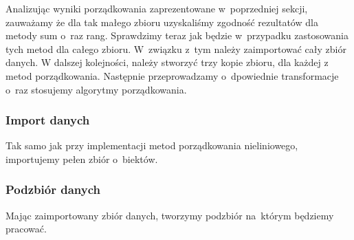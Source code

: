 \documentclass[12pt,a4paper]{report}
\begin{document}
{Analizując wyniki porządkowania zaprezentowane w~poprzedniej sekcji, zauważamy że dla tak małego zbioru uzyskaliśmy zgodność rezultatów dla metody sum o~raz rang. Sprawdzimy teraz jak będzie w~przypadku zastosowania tych metod dla całego zbioru. W~związku z~tym należy zaimportować cały zbiór danych. W dalszej kolejności, należy stworzyć trzy kopie zbioru, dla każdej z metod porządkowania. Następnie przeprowadzamy o~dpowiednie transformacje o~raz stosujemy algorytmy porządkowania.
 
\subsubsection{Import danych}
Tak samo jak przy implementacji metod porządkowania nieliniowego, importujemy pełen zbiór o~biektów.
\begin{Shaded}
\begin{Highlighting}[]
\StringTok{ }\NormalTok{(}\NormalTok{, }
                            \NormalTok{)}
\end{Highlighting}
\end{Shaded}
\subsubsection{Podzbiór danych}
Mając zaimportowany zbiór danych, tworzymy podzbiór na~którym będziemy pracować. 
\begin{Shaded}
\begin{Highlighting}[]
\NormalTok{dane_porzadkowanie<-zbior_danych[}\NormalTok{(}\NormalTok{,}\NormalTok{,}\NormalTok{,}
                                   \NormalTok{,}
                                   \NormalTok{,}\NormalTok{)]}
\end{Highlighting}
\end{Shaded}
}
\end{document}
